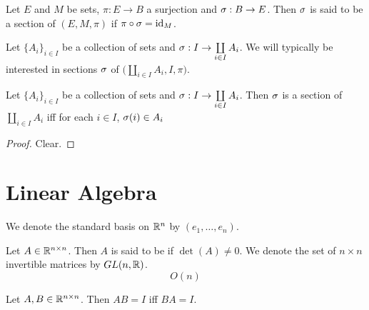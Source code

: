 \documentclass{book}
\begin{document}
	\begin{defn}
		Let $E$ and $M$ be sets, $\pi:E \rightarrow B$ a surjection and $\sigma: B \rightarrow E$. Then $\sigma$ is said to be a section of $(E, M, \pi)$ if $\pi \circ \sigma = \operatorname{id}_{M}$. 
	\end{defn}

	\begin{note}
		Let $\{A_i\}_{i \in I}$ be a collection of sets and $\sigma: I \rightarrow \coprod\limits_{i \in I} A_i$. We will typically be interested in sections $\sigma$ of $\bigg( \coprod\limits_{i \in I} A_i, I, \pi \bigg)$.
	\end{note}

	\begin{ex}
		Let $\{A_i\}_{i \in I}$ be a collection of sets and $\sigma: I \rightarrow \coprod\limits_{i \in I} A_i$. Then $\sigma$ is a section of $\coprod\limits_{i \in I} A_i$ iff for each $i \in I$, $\sigma(i) \in A_i$
	\end{ex}
	
	\begin{proof}
		Clear.
	\end{proof}















	\newpage
	\section{Linear Algebra}
	
	\begin{note}
		We denote the standard basis on $\mathbb{R}^n$ by $(e_1, \ldots, e_n)$.
	\end{note}

	\begin{defn}
		Let $A \in \mathbb{R}^{n \times n}$. Then $A$ is said to be  if $\det(A) \neq 0$. We denote the set of $n \times n$ invertible matrices by $GL(n, \mathbb{R})$.
		$$O(n)$$
	\end{defn}

	\begin{ex}
		Let $A,B \in \mathbb{R}^{n \times n}$. Then $AB = I$ iff $BA = I$.
	\end{ex}
\end{document}

